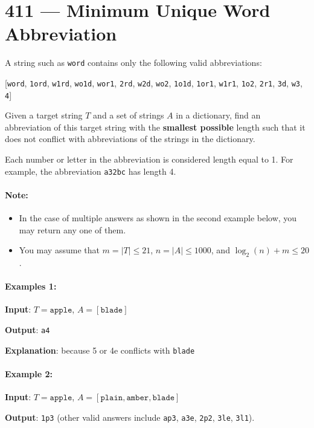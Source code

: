 \section{411 --- Minimum Unique Word Abbreviation}
A string such as \texttt{word} contains only the following valid abbreviations:

[\texttt{word}, \texttt{1ord}, \texttt{w1rd}, \texttt{wo1d}, \texttt{wor1}, \texttt{2rd}, \texttt{w2d}, \texttt{wo2}, \texttt{1o1d}, \texttt{1or1}, \texttt{w1r1}, \texttt{1o2}, \texttt{2r1}, \texttt{3d}, \texttt{w3}, \texttt{4}]

Given a target string $T$ and a set of strings $A$ in a dictionary, find an abbreviation of this target string with the \textbf{smallest possible} length such that it does not conflict with abbreviations of the strings in the dictionary.

Each number or letter in the abbreviation is considered length equal to 1. For example, the abbreviation \texttt{a32bc} has length 4.

\paragraph{Note:}
\begin{itemize}
\item In the case of multiple answers as shown in the second example below, you may return any one of them.
\item You may assume that $m=\lvert T\rvert \leq 21$, $n=\lvert A\rvert \leq 1000$, and $\log_2(n) + m \leq 20$.
\end{itemize}

\paragraph{Examples 1:}

\begin{flushleft}
\textbf{Input}: $T=\texttt{apple}$, $A=[\texttt{blade}]$

\textbf{Output}: \texttt{a4}

\textbf{Explanation}: because 5 or 4e conflicts with \texttt{blade}


\end{flushleft}

\paragraph{Example 2:}

\begin{flushleft}
\textbf{Input}: $T=\texttt{apple}$, $A=[\texttt{plain}, \texttt{amber}, \texttt{blade}]$

\textbf{Output}: \texttt{1p3} (other valid answers include \texttt{ap3}, \texttt{a3e}, \texttt{2p2}, \texttt{3le}, \texttt{3l1}).
\end{flushleft}

